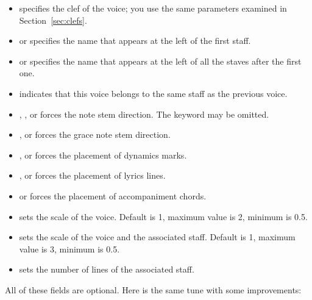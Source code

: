 \documentclass[a4paper,12pt]{book}
\begin{document}
\begin{itemize}
  
  \item {} specifies the clef of the voice; you use the same
  parameters examined in Section~\ref{sec:clefs}.
  
  \item {} or  specifies the
  name that appears at the left of the first staff.
  
  \item {} or  specifies the
  name that appears at the left of all the staves after the first one.
  
  \item {} indicates that this voice belongs to the same staff as
  the previous voice.
  
  \item {} , , or  forces
  the note stem direction. The  keyword may be omitted.

  \item {},  or 
  forces the grace note stem direction.
  
  \item {},  or 
  forces the placement of dynamics marks.

  \item {},  or 
  forces the placement of lyrics lines.

  \item {} or  forces the placement of
  accompaniment chords.

  \item {} sets the scale of the voice. Default is
  1, maximum value is 2, minimum is 0.5.

  \item {} sets the scale of the voice and the
  associated staff. Default is 1, maximum value is 3, minimum is 0.5.
  
  \item {} sets the number of lines of the
  associated staff.
  
\end{itemize}

All of these fields are optional. Here is the same tune with some
improvements:
\end{document}

